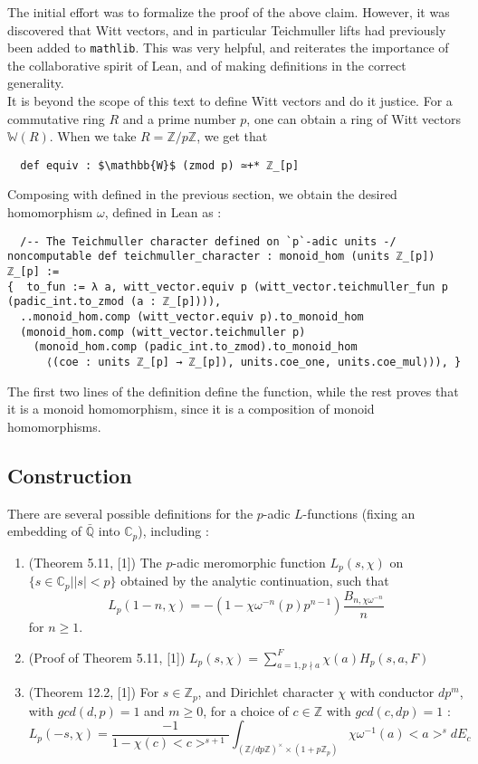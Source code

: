 \documentclass[11pt]{article}
\begin{document}
The initial effort was to formalize the proof of the above claim. However, it was discovered that
Witt vectors, and in particular Teichmuller lifts had previously been added to \texttt{mathlib}.
This was very helpful, and reiterates the importance of the collaborative spirit of Lean,
and of making definitions in the correct generality. \\

It is beyond the scope of this text to define Witt vectors and do it justice. For a commutative ring
$R$ and a prime number $p$, one can obtain a ring of Witt vectors $\mathbb{W}(R)$.
When we take $R = \mathbb{Z}/p \mathbb{Z}$, we get that

\begin{lstlisting}
  def equiv : $\mathbb{W}$ (zmod p) ≃+* ℤ_[p]
\end{lstlisting}
Composing  with  defined in the previous section, we obtain
the desired homomorphism $\omega$, defined in Lean as :
\begin{lstlisting}
  /-- The Teichmuller character defined on `p`-adic units -/
noncomputable def teichmuller_character : monoid_hom (units ℤ_[p]) ℤ_[p] :=
{  to_fun := λ a, witt_vector.equiv p (witt_vector.teichmuller_fun p (padic_int.to_zmod (a : ℤ_[p]))),
  ..monoid_hom.comp (witt_vector.equiv p).to_monoid_hom
  (monoid_hom.comp (witt_vector.teichmuller p)
    (monoid_hom.comp (padic_int.to_zmod).to_monoid_hom
      ⟨(coe : units ℤ_[p] → ℤ_[p]), units.coe_one, units.coe_mul⟩)), }
\end{lstlisting}
The first two lines of the definition define the function, while the rest proves that it is a
monoid homomorphism, since it is a composition of monoid homomorphisms.

\subsection{Construction}
There are several possible definitions for the $p$-adic $L$-functions (fixing an embedding of
$\mathbb{\bar{\mathbb{Q}}}$ into $\mathbb{C}_p$), including :
\begin{enumerate}{}{}
  \item (Theorem 5.11, [1]) The $p$-adic meromorphic function $L_p(s, \chi)$ on
  $\{ s \in \mathbb{C}_p | |s| < p \}$ obtained by the analytic continuation, such that
  $$ L_p (1 - n, \chi) = -(1 - \chi \omega^{-n}(p)p^{n - 1}) \frac{B_{n, \chi \omega^{-n}}}{n} $$
  for $n \ge 1$.
  \item (Proof of Theorem 5.11, [1])
  $L_p(s, \chi) = \sum_{a = 1, p\nmid a}^F \chi(a)H_p(s, a, F)$
  \item (Theorem 12.2, [1]) For $s \in \mathbb{Z}_p$, and Dirichlet character $\chi$ with
  conductor $d p^m$, with $gcd (d, p) = 1$ and $m \ge 0$, for a choice of $c \in \mathbb{Z}$
  with $gcd (c, dp) = 1$ :
  $$ L_p(-s, \chi) = \frac{-1}{1 - \chi(c)<c>^{s+1}}
  \int_{(\mathbb{Z}/dp \mathbb{Z})^{\times} \times (1 + p \mathbb{Z}_p)}
  \chi \omega^{-1}(a) <a>^s dE_c $$
\end{enumerate}
\end{document}
